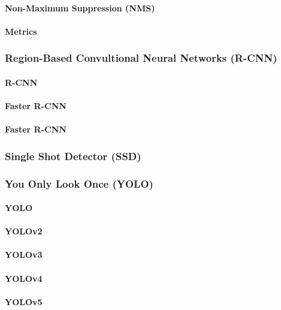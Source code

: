 \documentclass[a4paper,11pt,oneside]{article}
\begin{document}
  \paragraph{Non-Maximum Suppression (NMS)}
  \paragraph{Metrics}

  \subsubsection{Region-Based Convultional Neural Networks (R-CNN)}

  \paragraph{R-CNN}
  \paragraph{Faster R-CNN}
  \paragraph{Faster R-CNN}

  \subsubsection{Single Shot Detector (SSD)}
  \subsubsection{You Only Look Once (YOLO)}

  \paragraph{YOLO}
  \paragraph{YOLOv2}
  \paragraph{YOLOv3}
  \paragraph{YOLOv4}
  \paragraph{YOLOv5}
\end{document}
